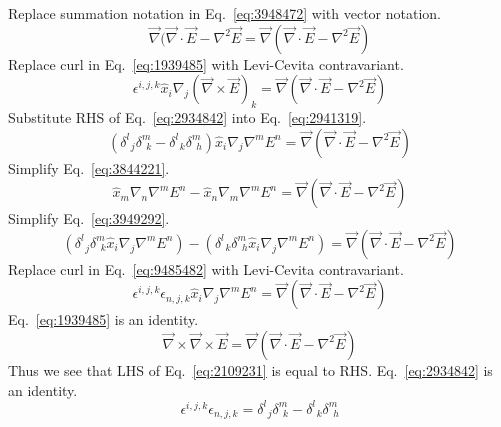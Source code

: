 \documentclass[12pt]{report}
\newcommand{\rowContravariantColumnCovariant}[3]{#1^{#2}_{\ \ #3}} %
\newcommand{\simplify}[2]{Simplify Eq.~\ref{eq:#1}.}
\newcommand{\declareIdentity}[1]{Eq.~\ref{eq:#1} is an identity.}
\newcommand{\ReplaceSummationNotationWithVectorNotation}[2]{Replace summation notation in Eq.~\ref{eq:#1} with vector notation.}
\newcommand{\ReplaceCurlWithLeviCevitaSummationContravariant}[2]{Replace curl in Eq.~\ref{eq:#1} with Levi-Cevita contravariant.}
\newcommand{\subRHSofExprXintoExprY}[3]{Substitute RHS of Eq.~\ref{eq:#1} into Eq.~\ref{eq:#2}.}
\newcommand{\claimLHSequalsRHS}[1]{Thus we see that LHS of Eq.~\ref{eq:#1} is equal to RHS.}
\begin{document}
\ReplaceSummationNotationWithVectorNotation{3948472}{2109231}
\begin{equation}
\vec{\nabla}(\vec{\nabla} \cdot \vec{E} - \nabla^2 \vec{E} = \vec{\nabla}(\vec{\nabla} \cdot \vec{E} - \nabla^2 \vec{E})
\label{eq:2109231}
\end{equation}
\ReplaceCurlWithLeviCevitaSummationContravariant{1939485}{9485482}
\begin{equation}
\epsilon^{i,j,k} \hat{x}_i \nabla_j ( \vec{\nabla} \times \vec{E} )_k = \vec{\nabla}(\vec{\nabla} \cdot \vec{E} - \nabla^2 \vec{E})
\label{eq:9485482}
\end{equation}
\subRHSofExprXintoExprY{2934842}{2941319}{3949292}
\begin{equation}
\left( \rowContravariantColumnCovariant{\delta}{l}{j} \rowContravariantColumnCovariant{\delta}{m}{k} - \rowContravariantColumnCovariant{\delta}{l}{k} \rowContravariantColumnCovariant{\delta}{m}{h} \right) \hat{x}_i \nabla_j \nabla^m E^n = \vec{\nabla}(\vec{\nabla} \cdot \vec{E} - \nabla^2 \vec{E})
\label{eq:3949292}
\end{equation}
\simplify{3844221}{3948472}
\begin{equation}
\hat{x}_m \nabla_n \nabla^m E^n - \hat{x}_n \nabla_m \nabla^m E^n = \vec{\nabla}(\vec{\nabla} \cdot \vec{E} - \nabla^2 \vec{E})
\label{eq:3948472}
\end{equation}
\simplify{3949292}{3844221}
\begin{equation}
\left( \rowContravariantColumnCovariant{\delta}{l}{j} \rowContravariantColumnCovariant{\delta}{m}{k} \hat{x}_i \nabla_j \nabla^m E^n\right)-\left( \rowContravariantColumnCovariant{\delta}{l}{k} \rowContravariantColumnCovariant{\delta}{m}{h} \hat{x}_i \nabla_j \nabla^m E^n \right) = \vec{\nabla}(\vec{\nabla} \cdot \vec{E} - \nabla^2 \vec{E})
\label{eq:3844221}
\end{equation}
\ReplaceCurlWithLeviCevitaSummationContravariant{9485482}{2941319}
\begin{equation}
\epsilon^{i,j,k} \epsilon_{n,j,k} \hat{x}_i \nabla_j \nabla^m E^n = \vec{\nabla}(\vec{\nabla} \cdot \vec{E} - \nabla^2 \vec{E})
\label{eq:2941319}
\end{equation}
\declareIdentity{1939485}
\begin{equation}
\vec{\nabla} \times \vec{\nabla} \times \vec{E} = \vec{\nabla}(\vec{\nabla} \cdot \vec{E} - \nabla^2 \vec{E})
\label{eq:1939485}
\end{equation}
\claimLHSequalsRHS{2109231}
\declareIdentity{2934842}
\begin{equation}
\epsilon^{i,j,k} \epsilon_{n,j,k} = \rowContravariantColumnCovariant{\delta}{l}{j} \rowContravariantColumnCovariant{\delta}{m}{k} - \rowContravariantColumnCovariant{\delta}{l}{k} \rowContravariantColumnCovariant{\delta}{m}{h}
\label{eq:2934842}
\end{equation}
\end{document}
